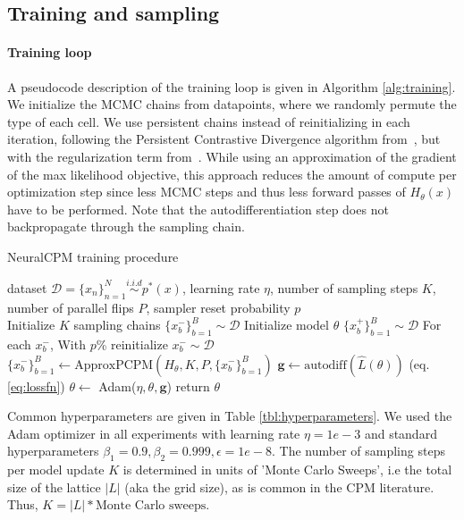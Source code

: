 \subsection{Training and sampling}

\paragraph{Training loop}
A pseudocode description of the training loop is given in Algorithm \ref{alg:training}. We initialize the MCMC chains from datapoints, where we randomly permute the type of each cell. We use persistent chains instead of reinitializing in each iteration, following the Persistent Contrastive Divergence algorithm from~\cite{tieleman2008training}, but with the regularization term from~\cite{du2019implicit}. While using an approximation of the gradient of the max likelihood objective, this approach reduces the amount of compute per optimization step since less MCMC steps and thus less forward passes of $H_\theta(x)$ have to be performed. Note that the autodifferentiation step does not backpropagate through the sampling chain.
\begin{algorithm}[h]
   \caption{NeuralCPM training procedure}
   \label{alg:training}
\begin{algorithmic}
    dataset $\mathcal{D} = \{x_n\}^N_{n=1}\overset{i.i.d}{\sim}p^*(x)$, learning rate $\eta$, number of sampling steps $K$, number of parallel flips $P$, sampler reset probability $p$
   \hspace{4mm}\\
   \STATE Initialize $K$ sampling chains $\{x_b^-\}^B_{b=1} \sim \mathcal{D}$
   \STATE Initialize model $\theta$
    \STATE $\{x_b^+\}^B_{b=1} \sim \mathcal{D}$
    \STATE For each $x_b^-$, With $p$\% reinitialize $x_b^- \sim \mathcal{D}$
    \STATE $\{x_b^-\}^B_{b=1} \leftarrow \text{ApproxPCPM}(H_\theta, K, P, \{x_b^-\}^B_{b=1})$
    \STATE $\mathbf{g} \leftarrow \text{autodiff}(\hat{L}(\theta))$ (eq. \ref{eq:lossfn})
    \STATE $\theta \leftarrow$ Adam($\eta, \theta, \mathbf{g}$)
    \ENDWHILE
    \STATE return $\theta$
\end{algorithmic}
\end{algorithm}
Common hyperparameters are given in Table \ref{tbl:hyperparameters}. We used the Adam optimizer in all experiments with learning rate $\eta=1e-3$ and standard hyperparameters $\beta_1=0.9, \beta_2=0.999, \epsilon=1e-8$. The number of sampling steps per model update $K$ is determined in units of 'Monte Carlo Sweeps', i.e the total size of the lattice $|L|$ (aka the grid size), as is common in the CPM literature. Thus, $K = |L| * \text{Monte Carlo sweeps}$.
